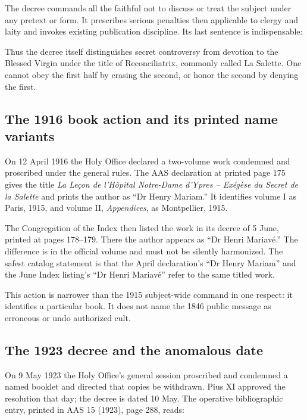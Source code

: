 The decree commands all the faithful not to discuss or treat the subject under any pretext or form. It prescribes serious penalties then applicable to clergy and laity and invokes existing publication discipline. Its last sentence is indispensable:

\begin{quote}
\small{}
\end{quote}

Thus the decree itself distinguishes secret controversy from devotion to the Blessed Virgin under the title of Reconciliatrix, commonly called La Salette. One cannot obey the first half by erasing the second, or honor the second by denying the first.

\subsection{The 1916 book action and its printed name variants}

On 12 April 1916 the Holy Office declared a two-volume work condemned and proscribed under the general rules. The AAS declaration at printed page 175 gives the title \emph{La Leçon de l'Hôpital Notre-Dame d'Ypres -- Exégèse du Secret de la Salette} and prints the author as ``Dr Henry Mariam.'' It identifies volume I as Paris, 1915, and volume II, \emph{Appendices}, as Montpellier, 1915.

The Congregation of the Index then listed the work in its decree of 5 June, printed at pages 178--179. There the author appears as ``Dr Henri Mariavé.'' The difference is in the official volume and must not be silently harmonized. The safest catalog statement is that the April declaration's ``Dr Henry Mariam'' and the June Index listing's ``Dr Henri Mariavé'' refer to the same titled work.

This action is narrower than the 1915 subject-wide command in one respect: it identifies a particular book. It does not name the 1846 public message as erroneous or undo authorized cult.

\subsection{The 1923 decree and the anomalous date}

On 9 May 1923 the Holy Office's general session proscribed and condemned a named booklet and directed that copies be withdrawn. Pius XI approved the resolution that day; the decree is dated 10 May. The operative bibliographic entry, printed in AAS 15 (1923), page 288, reads:

